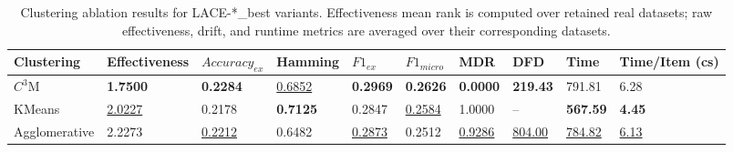 \begin{table}
\caption{Clustering ablation results for LACE-*\_best variants. Effectiveness mean rank is computed over retained real datasets; raw effectiveness, drift, and runtime metrics are averaged over their corresponding datasets.}
\label{tab:clustering_ablation_results}
\begin{tabular}{llllllllll}
\toprule
Clustering & Effectiveness & $Accuracy_{ex}$ & Hamming & $F1_{ex}$ & $F1_{micro}$ & MDR & DFD & Time & Time/Item (cs) \\
\midrule
$C^3$M & \textbf{1.7500} & \textbf{0.2284} & \underline{0.6852} & \textbf{0.2969} & \textbf{0.2626} & \textbf{0.0000} & \textbf{219.43} & 791.81 & 6.28 \\
KMeans & \underline{2.0227} & 0.2178 & \textbf{0.7125} & 0.2847 & \underline{0.2584} & 1.0000 & -- & \textbf{567.59} & \textbf{4.45} \\
Agglomerative & 2.2273 & \underline{0.2212} & 0.6482 & \underline{0.2873} & 0.2512 & \underline{0.9286} & \underline{804.00} & \underline{784.82} & \underline{6.13} \\
\bottomrule
\end{tabular}
\end{table}
